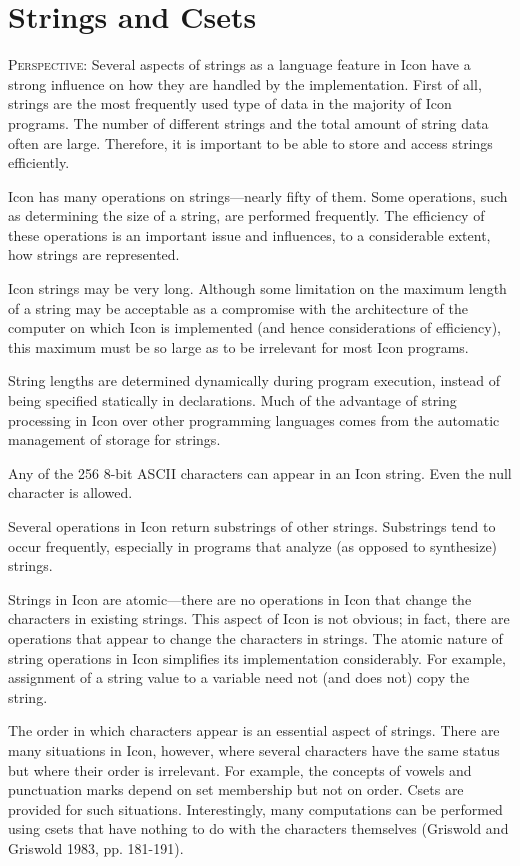 \chapter{Strings and Csets}

\textsc{Perspective}: Several aspects of strings as a language feature
in Icon have a strong influence on how they are handled by the
implementation. First of all, strings are the most frequently used
type of data in the majority of Icon programs. The number of different
strings and the total amount of string data often are
large. Therefore, it is important to be able to store and access
strings efficiently.

Icon has many operations on strings---nearly fifty of them. Some
operations, such as determining the size of a string, are performed
frequently. The efficiency of these operations is an important issue
and influences, to a considerable extent, how strings are represented.

Icon strings may be very long. Although some limitation on the maximum
length of a string may be acceptable as a compromise with the
architecture of the computer on which Icon is implemented (and hence
considerations of efficiency), this maximum must be so large as to be
irrelevant for most Icon programs.

String lengths are determined dynamically during program execution,
instead of being specified statically in declarations. Much of the
advantage of string processing in Icon over other programming
languages comes from the automatic management of storage for strings.

Any of the 256 8-bit ASCII characters can appear in an Icon
string. Even the {\textquotedbl}null{\textquotedbl} character is
allowed.

Several operations in Icon return substrings of other
strings. Substrings tend to occur frequently, especially in programs
that analyze (as opposed to synthesize) strings.


Strings in Icon are atomic---there are no operations in Icon that
change the characters in existing strings. This aspect of Icon is not
obvious; in fact, there are operations that appear to change the
characters in strings. The atomic nature of string operations in Icon
simplifies its implementation considerably. For example, assignment of
a string value to a variable need not (and does not) copy the string.

The order in which characters appear is an essential aspect of
strings. There are many situations in Icon, however, where several
characters have the same status but where their order is
irrelevant. For example, the concepts of vowels and punctuation marks
depend on set membership but not on order. Csets are provided for such
situations. Interestingly, many computations can be performed using
csets that have nothing to do with the characters themselves (Griswold
and Griswold 1983, pp. 181-191).


